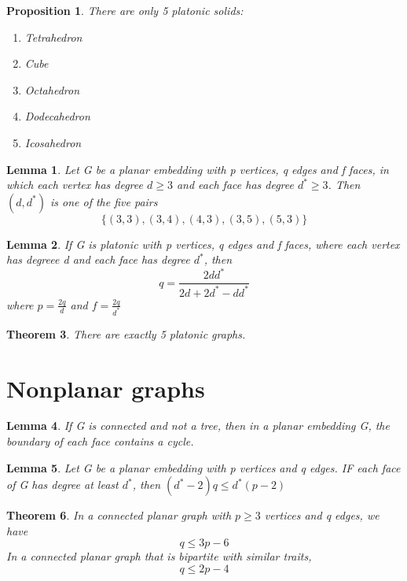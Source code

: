 \documentclass[11pt, oneside]{book}
\theoremstyle{break}
\newtheorem{thm}{Theorem}[section]
\newtheorem{lemma}[thm]{Lemma}
\newtheorem{propo}{Proposition}[section]
\begin{document}
\begin{propo}
	There are only 5 platonic solids:
	\begin{enumerate}
		\item Tetrahedron
		\item Cube
		\item Octahedron
		\item Dodecahedron
		\item Icosahedron
	\end{enumerate}
\end{propo}

\begin{lemma}
	Let G be a planar embedding with p vertices, q edges and f faces, in which each vertex has degree $d \geq 3$ and each face has degree $d^* \geq 3$. Then $(d, d^*)$ is one of the five pairs
	\[
		\{(3, 3), (3, 4), (4, 3), (3, 5), (5, 3)\}
	\]
\end{lemma}

\begin{lemma}
	If G is platonic with p vertices, q edges and f faces, where each vertex has degreee d and each face has degree $d^*$, then
	\[
		q = \frac{2dd^*}{2d + 2d^* -dd^*}
	\]
	where $p=\frac{2q}{d}$ and $f = \frac{2q}{d^*}$
\end{lemma}

\begin{thm}
	There are exactly 5 platonic graphs.
\end{thm}


\section{Nonplanar graphs}

\begin{lemma}
	If G is connected and not a tree, then in a planar embedding G, the boundary of each face contains a cycle.
\end{lemma}

\begin{lemma}
	Let G be a planar embedding with p vertices and q edges. IF each face of G has degree at least $d^*$, then $(d^* - 2)q \leq d^*(p-2)$
\end{lemma}

\begin{thm}
	In a connected planar graph with $p \geq 3$ vertices and q edges, we have
	\[
		q \leq 3p - 6
	\]
	In a connected planar graph that is bipartite with similar traits,
	\[
		q \leq 2p - 4
	\]
\end{thm}
\end{document}
